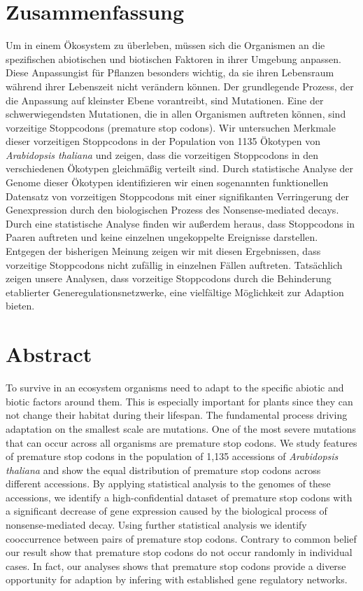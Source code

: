 \documentclass[english,onecolumn]{scrreprt}
\begin{document}
\chapter*{Zusammenfassung}
Um in einem Ökosystem zu überleben, müssen sich die Organismen an die spezifischen abiotischen und biotischen Faktoren in ihrer Umgebung anpassen. Diese Anpassungist für Pflanzen besonders wichtig, da sie ihren Lebensraum während ihrer Lebenszeit nicht verändern können. Der grundlegende Prozess, der die Anpassung auf kleinster Ebene vorantreibt, sind Mutationen. Eine der schwerwiegendsten Mutationen, die in allen Organismen auftreten können, sind vorzeitige Stoppcodons (premature stop codons). Wir untersuchen Merkmale dieser vorzeitigen Stoppcodons in der Population von 1135 Ökotypen von \textit{Arabidopsis thaliana} und zeigen, dass die vorzeitigen Stoppcodons in den verschiedenen Ökotypen gleichmäßig verteilt sind. Durch statistische Analyse der Genome dieser Ökotypen identifizieren wir einen sogenannten funktionellen Datensatz von vorzeitigen Stoppcodons mit einer signifikanten Verringerung der Genexpression durch den biologischen Prozess des Nonsense-mediated decays. Durch eine statistische Analyse finden wir außerdem heraus, dass Stoppcodons in Paaren auftreten und keine einzelnen ungekoppelte Ereignisse darstellen. Entgegen der bisherigen Meinung zeigen wir mit diesen Ergebnissen, dass vorzeitige Stoppcodons nicht zufällig in einzelnen Fällen auftreten. Tatsächlich zeigen unsere Analysen, dass vorzeitige Stoppcodons durch die Behinderung etablierter Generegulationsnetzwerke, eine vielfältige Möglichkeit zur Adaption bieten. 

\chapter*{Abstract}
To survive in an ecosystem organisms need to adapt to the specific abiotic and biotic factors around them. This is especially important for plants since they can not change their habitat during their lifespan. The fundamental process driving adaptation on the smallest scale are mutations. One of the most severe mutations that can occur across all organisms are premature stop codons. We study features of premature stop codons in the population of 1,135 accessions of \textit{Arabidopsis thaliana} and show the equal distribution of premature stop codons across different accessions. By applying statistical analysis to the genomes of these accessions, we identify a high-confidential dataset of premature stop codons with a significant decrease of gene expression caused by the biological process of nonsense-mediated decay. Using further statistical analysis we identify cooccurrence between pairs of premature stop codons. Contrary to common belief our result show that premature stop codons do not occur randomly in individual cases. In fact, our analyses shows that premature stop codons provide a diverse opportunity for adaption by infering with established gene regulatory networks.
\end{document}
